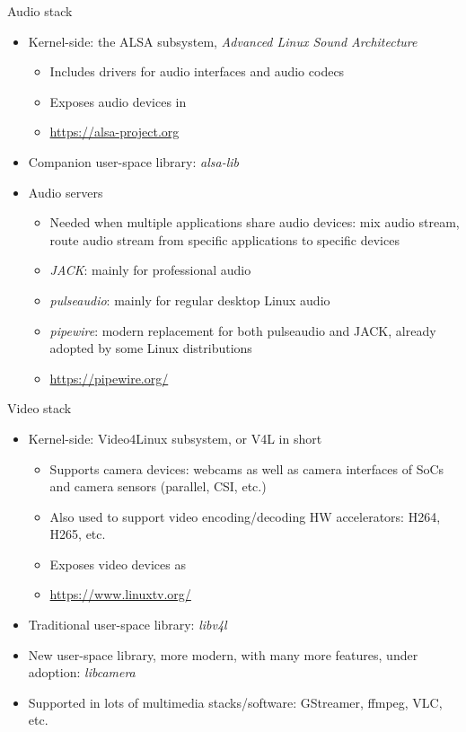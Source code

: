 \begin{frame}{Audio stack}
  \begin{itemize}
  \item Kernel-side: the ALSA subsystem, {\em Advanced Linux Sound
      Architecture}
    \begin{itemize}
    \item Includes drivers for audio interfaces and audio codecs
    \item Exposes audio devices in 
    \item \url{https://alsa-project.org}
    \end{itemize}
  \item Companion user-space library: {\em alsa-lib}
  \item Audio servers
    \begin{itemize}
    \item Needed when multiple applications share audio devices: mix
      audio stream, route audio stream from specific applications to
      specific devices
    \item {\em JACK}: mainly for professional audio
    \item {\em pulseaudio}: mainly for regular desktop Linux audio
    \item {\em pipewire}: modern replacement for both pulseaudio and
      JACK, already adopted by some Linux distributions
    \item \url{https://pipewire.org/}
    \end{itemize}
  \end{itemize}
\end{frame}

\begin{frame}{Video stack}
  \begin{itemize}
  \item Kernel-side: Video4Linux subsystem, or V4L in short
    \begin{itemize}
    \item Supports camera devices: webcams as well as camera
      interfaces of SoCs and camera sensors (parallel, CSI, etc.)
    \item Also used to support video encoding/decoding HW
      accelerators: H264, H265, etc.
    \item Exposes video devices as 
    \item \url{https://www.linuxtv.org/}
    \end{itemize}
  \item Traditional user-space library: {\em libv4l}
  \item New user-space library, more modern, with many more features,
    under adoption: {\em libcamera}
  \item Supported in lots of multimedia stacks/software: GStreamer,
    ffmpeg, VLC, etc.
  \end{itemize}
\end{frame}

